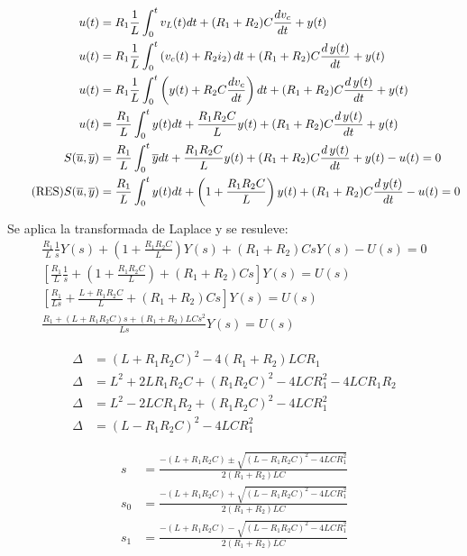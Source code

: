 \begin{align*}
  u(t)                            & =
  R_1 \frac{1}{L}\int_0^t v_L(t) dt +
  (R_1 + R_2) C\frac{dv_c}{dt} +
  y(t) \\
  u(t)                            & =
  R_1 \frac{1}{L}\int_0^t \left(v_c(t) + R_2 i_2 \right) dt +
  (R_1 + R_2) C\frac{d\thinspace y(t)}{dt} +
  y(t) \\
  u(t)                            & =
  R_1 \frac{1}{L}\int_0^t \left(  y(t) + R_2 C\frac{dv_c}{dt} \right) dt +
  (R_1 + R_2) C\frac{d\thinspace y(t)}{dt} +
  y(t) \\
  u(t)                            & =
  \frac{R_1}{L}\int_0^t  y(t) dt +
  \frac{R_1 R_2 C}{L} y(t) +
  (R_1 + R_2) C\frac{d\thinspace y(t)}{dt} +
  y(t) \\
  S( \overline{u},  \overline{y}) & =
  \frac{R_1}{L}\int_0^t \overline{y} dt +
  \frac{R_1 R_2 C}{L} y(t) +
  (R_1 + R_2) C\frac{d\thinspace y(t)}{dt} +
  y(t) -  u(t) = 0 \\
  \tag{RES}
  S( \overline{u},  \overline{y}) & =
  \frac{R_1}{L}\int_0^t  y(t) dt +
  \left( 1 + \frac{R_1 R_2 C}{L} \right)  y(t) +
  (R_1 + R_2) C\frac{d\thinspace y(t)}{dt} -
  u(t) = 0
\end{align*}

Se aplica la transformada de Laplace y se resuleve:
\begin{align*}
  \frac{R_1}{L}\frac{1}{s} Y(s) +
  \left( 1 + \frac{R_1 R_2 C}{L} \right)  Y(s) +
  (R_1 + R_2) C s Y(s) -
  U(s) = 0
  \\
  \left[
    \frac{R_1}{L}\frac{1}{s} +
    \left( 1 + \frac{R_1 R_2 C}{L} \right) +
    (R_1 + R_2) C s
  \right] Y(s) = U(s)
  \\
  \left[
    \frac{R_1}{Ls} +
    \frac{L + R_1 R_2 C}{L} +
    (R_1 + R_2) C s
  \right] Y(s) = U(s)
  \\
  \frac{R_1 + (L + R_1 R_2 C)s + (R_1 + R_2) L C s^2}{Ls} Y(s) = U(s)
\end{align*}

\begin{align*}
  \Delta &= (L + R_1 R_2 C)^2 - 4 (R_1 + R_2) L C R_1 \\
  \Delta &= L^2 + 2 L R_1 R_2 C + (R_1 R_2 C)^2 - 4 L C R_1^2 - 4 L C R_1 R_2 \\
  \Delta &= L^2 - 2 L C R_1 R_2 + (R_1 R_2 C)^2 - 4 L C R_1^2  \\
  \Delta &= (L - R_1 R_2 C)^2 - 4 L C R_1^2
\end{align*}

\begin{align*}
  s &= \frac{-(L + R_1 R_2 C) \pm \sqrt{(L - R_1 R_2 C)^2 - 4 L C R_1^2}}{2 (R_1 + R_2) L C} \\
  s_0 &= \frac{-(L + R_1 R_2 C) + \sqrt{(L - R_1 R_2 C)^2 - 4 L C R_1^2}}{2 (R_1 + R_2) L C} \\
  s_1 &= \frac{-(L + R_1 R_2 C) - \sqrt{(L - R_1 R_2 C)^2 - 4 L C R_1^2}}{2 (R_1 + R_2) L C}
\end{align*}

